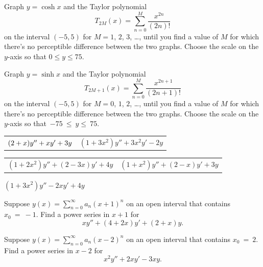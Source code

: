 \begin{exerciselist}
  \item\label{exer:7.1.9} \Lex Graph $y=\cosh x$ and the Taylor polynomial
  \[
    T_{2M}(x)=\sum_{n=0}^{M}\frac{x^{2n}}{(2n)!}
  \]
  on the interval $(-5,5)$ for $M=1$, $2$, $3$, \dots, until you find a value of $M$ for which
  there's no perceptible difference between the two graphs. Choose the scale on the $y$-axis so that
  $0\le y\le75$.

  \item\label{exer:7.1.10} \Lex Graph $y=\sinh x$ and the Taylor polynomial
  \[
    T_{2M+1}(x)=\sum_{n=0}^{M}\frac{x^{2n+1}}{(2n+1)!}
  \]
  on the interval $(-5,5)$ for $M=0$, $1$, $2$, \dots, until you find a value of $M$ for which
  there's no perceptible difference between the two graphs. Choose the scale on the $y$-axis so
  that~$-75~\le~y\le~75$.


  \begin{tabular}[t]{@{}p{168pt}@{}p{168pt}}
    \item\label{exer:7.1.11} $\vspace*{-5pt}(2+x)y''+xy'+3y$ &
    \item\label{exer:7.1.12} \vspace*{10pt}$(1+3x^{2})y''+3x^{2}y'-2y$
  \end{tabular}

  \begin{tabular}[t]{@{}p{168pt}@{}p{168pt}}
    \item\label{exer:7.1.13} $(1+2x^{2})y''+(2-3x)y'+4y$ &
    \item\label{exer:7.1.14} $(1+x^{2})y''+(2-x)y'+3y$
  \end{tabular}

  \item\label{exer:7.1.15} $(1+3x^{2})y''-2xy'+4y$

  \item\label{exer:7.1.16} Suppose $y(x)=\sum_{n=0}^{\infty}a_{n}(x+1)^{n}$ on an open interval that
        contains $x_{0}~=~-1$. Find a power series in $x+1$ for
  \[
    xy''+(4+2x)y'+(2+x)y.
  \]

  \item\label{exer:7.1.17} Suppose $y(x)=\sum_{n=0}^{\infty}a_{n}(x-2)^{n}$ on an open interval that
        contains $x_{0}~=~2$. Find a power series in $x-2$ for
  \[
    x^{2}y''+2xy'-3xy.
  \]


\end{exerciselist}
